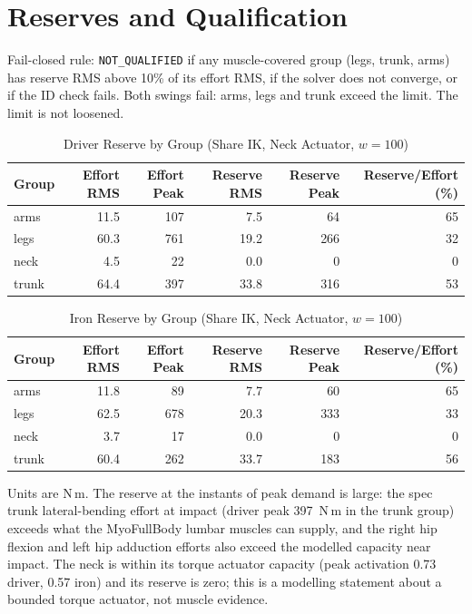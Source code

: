 \documentclass[11pt,a4paper]{article}
\begin{document}
\section{Reserves and Qualification}
Fail-closed rule: \texttt{NOT\_QUALIFIED} if any muscle-covered group (legs, trunk, arms) has reserve RMS above 10\% of its effort RMS, if the solver does not converge, or if the ID check fails. Both swings fail: arms, legs and trunk exceed the limit. The limit is not loosened.

\begin{table}[h]\centering\small
\caption{Driver Reserve by Group (Share IK, Neck Actuator, $w=100$)}
\begin{tabular}{lrrrrr}\toprule Group & Effort RMS & Effort Peak & Reserve RMS & Reserve Peak & Reserve/Effort (\%) \\\midrule
arms & 11.5 & 107 & 7.5 & 64 & 65 \\
legs & 60.3 & 761 & 19.2 & 266 & 32 \\
neck & 4.5 & 22 & 0.0 & 0 & 0 \\
trunk & 64.4 & 397 & 33.8 & 316 & 53 \\
\bottomrule\end{tabular}\end{table}

\begin{table}[h]\centering\small
\caption{Iron Reserve by Group (Share IK, Neck Actuator, $w=100$)}
\begin{tabular}{lrrrrr}\toprule Group & Effort RMS & Effort Peak & Reserve RMS & Reserve Peak & Reserve/Effort (\%) \\\midrule
arms & 11.8 & 89 & 7.7 & 60 & 65 \\
legs & 62.5 & 678 & 20.3 & 333 & 33 \\
neck & 3.7 & 17 & 0.0 & 0 & 0 \\
trunk & 60.4 & 262 & 33.7 & 183 & 56 \\
\bottomrule\end{tabular}\end{table}

\noindent Units are N\,m. The reserve at the instants of peak demand is large: the spec trunk lateral-bending effort at impact (driver peak 397~N\,m in the trunk group) exceeds what the MyoFullBody lumbar muscles can supply, and the right hip flexion and left hip adduction efforts also exceed the modelled capacity near impact. The neck is within its torque actuator capacity (peak activation 0.73 driver, 0.57 iron) and its reserve is zero; this is a modelling statement about a bounded torque actuator, not muscle evidence.
\end{document}
